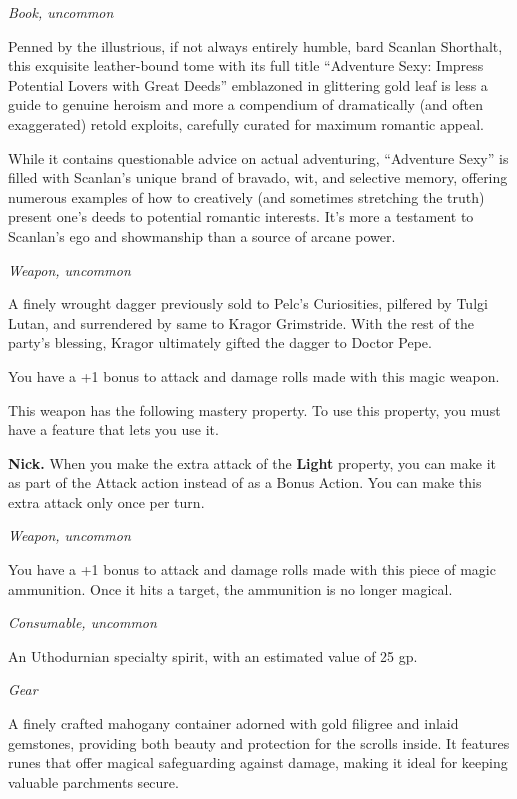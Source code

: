 \documentclass[
  letterpaper,12pt,twoside,twocolumn,openany,
  nodeprecatedcode,bg=full]{dndbook}
\begin{document}
\vfill\break

{\emph{Book, uncommon}}

Penned by the illustrious, if not always entirely humble, bard Scanlan
Shorthalt, this exquisite leather-bound tome with its full title
``Adventure Sexy: Impress Potential Lovers with Great Deeds'' emblazoned
in glittering gold leaf is less a guide to genuine heroism and more a
compendium of dramatically (and often exaggerated) retold exploits,
carefully curated for maximum romantic appeal.

While it contains questionable advice on actual adventuring, ``Adventure
Sexy'' is filled with Scanlan's unique brand of bravado, wit, and
selective memory, offering numerous examples of how to creatively (and
sometimes stretching the truth) present one's deeds to potential
romantic interests. It's more a testament to Scanlan's ego and
showmanship than a source of arcane power.

{\emph{Weapon, uncommon}}

A finely wrought dagger previously sold to Pelc's Curiosities, pilfered
by Tulgi Lutan, and surrendered by same to Kragor Grimstride. With the
rest of the party's blessing, Kragor ultimately gifted the dagger to
Doctor Pepe.

You have a +1 bonus to attack and damage rolls made with this magic
weapon.

This weapon has the following mastery property. To use this property,
you must have a feature that lets you use it.

\textbf{Nick.} When you make the extra attack of the \textbf{Light}
property, you can make it as part of the Attack action instead of as a
Bonus Action. You can make this extra attack only once per turn.

{\emph{Weapon, uncommon}}

You have a +1 bonus to attack and damage rolls made with this piece of
magic ammunition. Once it hits a target, the ammunition is no longer
magical.

{\emph{Consumable, uncommon}}

An Uthodurnian specialty spirit, with an estimated value of 25 gp.

{\emph{Gear}}

A finely crafted mahogany container adorned with gold filigree and
inlaid gemstones, providing both beauty and protection for the scrolls
inside. It features runes that offer magical safeguarding against
damage, making it ideal for keeping valuable parchments secure.
\end{document}
